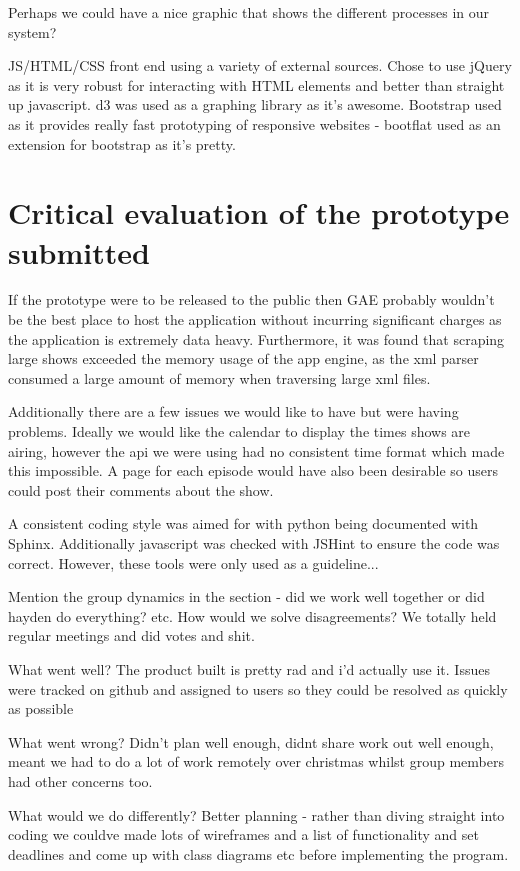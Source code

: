 \documentclass[12pt, a4paper]{article}
\begin{document}
Perhaps we could have a nice graphic that shows the different processes in our system?

JS/HTML/CSS front end using a variety of external sources. Chose to use jQuery as it is very robust for interacting with HTML elements and better than straight up javascript. d3 was used as a graphing library as it's awesome. Bootstrap used as it provides really fast prototyping of responsive websites - bootflat used as an extension for bootstrap as it's pretty.

\newpage	
\section{Critical evaluation of the prototype submitted}
If the prototype were to be released to the public then GAE probably wouldn't be the best place to host the application without incurring significant charges as the application is extremely data heavy. Furthermore, it was found that scraping large shows exceeded the memory usage of the app engine, as the xml parser consumed a large amount of memory when traversing large xml files. 

Additionally there are a few issues we would like to have but were having problems. Ideally we would like the calendar to display the times shows are airing, however the api we were using had no consistent time format which made this impossible. A page for each episode would have also been desirable so users could post their comments about the show. 

A consistent coding style was aimed for with python being documented with Sphinx. Additionally javascript was checked with JSHint to ensure the code was correct. However, these tools were only used as a guideline...

Mention the group dynamics in the section - did we work well together or did hayden do everything? etc. How would we solve disagreements? We totally held regular meetings and did votes and shit. 

What went well?
The product built is pretty rad and i'd actually use it.
Issues were tracked on github and assigned to users so they could be resolved as quickly as possible

What went wrong?
Didn't plan well enough, didnt share work out well enough, meant we had to do a lot of work remotely over christmas whilst group members had other concerns too.

What would we do differently?
Better planning - rather than diving straight into coding we couldve made lots of wireframes and a list of functionality and set deadlines and come up with class diagrams etc before implementing the program.
\end{document}
